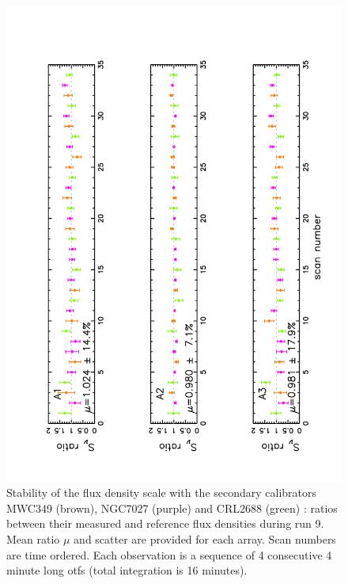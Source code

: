 \begin{figure}
\begin{center}
  \includegraphics[clip, angle=-90, scale=0.6]{Figures/Flux_vs_index_r9_cal_sec.pdf}
  \caption{Stability of the flux density scale with the secondary calibrators  MWC349 (brown), NGC7027 (purple)  and CRL2688 (green) :
    ratios between their measured and reference flux densities during run 9. Mean ratio $\mu$ and scatter are provided for each array.
    Scan numbers are time ordered. Each observation is a sequence of 4 consecutive 4 minute long otfs (total integration is 16 minutes).}
\label{fig:ratio_cal_sec}
\end{center}
\end{figure}


